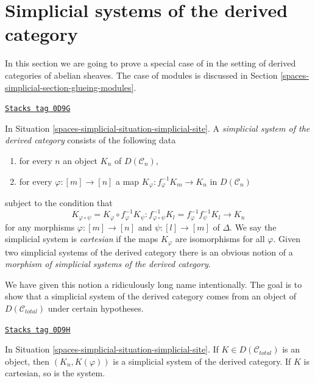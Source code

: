 \section{Simplicial systems of the derived category}
\label{spaces-simplicial-section-glueing}
In this section we are going to prove a special case of
\cite[Proposition 3.2.9]{BBD} in the setting of derived
categories of abelian sheaves. The case of modules
is discussed in Section \ref{spaces-simplicial-section-glueing-modules}.

\begin{definition}
\label{spaces-simplicial-definition-cartesian-derived}
\href{https://stacks.math.columbia.edu/tag/0D9G}{\texttt{Stacks tag 0D9G}}

In Situation \ref{spaces-simplicial-situation-simplicial-site}. A
{\it simplicial system of the derived category}
consists of the following data
\begin{enumerate}
\item for every $n$ an object $K_n$ of $D(\mathcal{C}_n)$,
\item for every $\varphi : [m] \to [n]$ a map
$K_\varphi : f_\varphi^{-1}K_m \to K_n$ in $D(\mathcal{C}_n)$
\end{enumerate}
subject to the condition that
$$
K_{\varphi \circ \psi} = K_\varphi \circ f_\varphi^{-1}K_\psi :
f_{\varphi \circ \psi}^{-1}K_l = f_\varphi^{-1} f_\psi^{-1}K_l
\longrightarrow
K_n
$$
for any morphisms $\varphi : [m] \to [n]$ and $\psi : [l] \to [m]$ of $\Delta$.
We say the simplicial system is {\it cartesian} if the maps $K_\varphi$
are isomorphisms for all $\varphi$.
Given two simplicial systems of the derived category
there is an obvious notion of a
{\it morphism of simplicial systems of the derived category}.
\end{definition}

We have given this notion a ridiculously long name intentionally.
The goal is to show that a simplicial system of the derived category
comes from an object of $D(\mathcal{C}_{total})$ under certain
hypotheses.

\begin{lemma}
\label{spaces-simplicial-lemma-cartesian-objects-derived}
\href{https://stacks.math.columbia.edu/tag/0D9H}{\texttt{Stacks tag 0D9H}}

In Situation \ref{spaces-simplicial-situation-simplicial-site}.
If $K \in D(\mathcal{C}_{total})$ is an object,
then $(K_n, K(\varphi))$ is a simplicial system of the derived category.
If $K$ is cartesian, so is the system.
\end{lemma}


